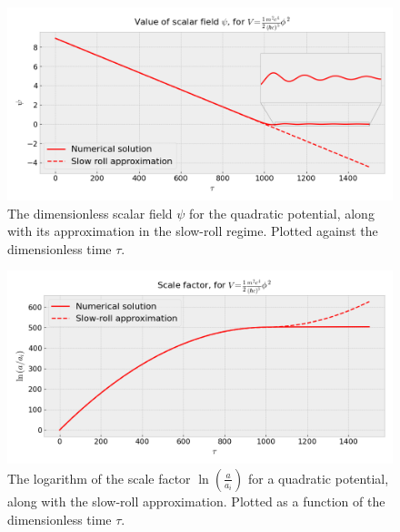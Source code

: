 \documentclass[reprint,english,notitlepage]{revtex4-1}  %
\numberwithin{equation}{section}
\begin{document}
\begin{figure}[h!]
	\includegraphics[width=\linewidth]{QuadraticPotential_field-value.png}
	\caption{The dimensionless scalar field $\psi$ for the quadratic potential,
	along with its approximation in the slow-roll regime. Plotted against the
	dimensionless time $\tau$.}
	\label{fig:quad_psi}
\end{figure}

\begin{figure}[h!]
	\includegraphics[width=\linewidth]{QuadraticPotential_scale-factor.png}
	\caption{The logarithm of the scale factor $\ln\left(\frac{a}{a_i}\right)$
	for a quadratic potential, along with the slow-roll approximation.
	Plotted as a function of the dimensionless time $\tau$.}
	\label{fig:quad_a}
\end{figure}
\end{document}
